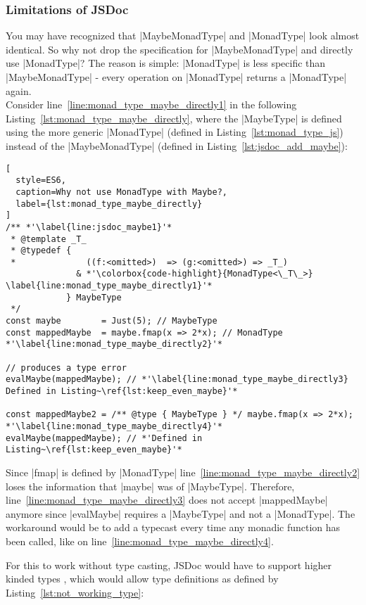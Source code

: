 \subsubsection{Limitations of JSDoc} %
\label{sec:Limitations of JSDoc}
You may have recognized that |MaybeMonadType| and |MonadType| look almost
identical. So why not drop the specification for |MaybeMonadType| and directly
use |MonadType|? The reason is simple: |MonadType| is less specific than
|MaybeMonadType| - every operation on |MonadType| returns a |MonadType|
again.\\
Consider line~\ref{line:monad_type_maybe_directly1} in the following
Listing~\ref{lst:monad_type_maybe_directly}, where the |MaybeType| is defined
using the more generic |MonadType| (defined in Listing~\ref{lst:monad_type_js})
instead of the |MaybeMonadType| (defined in Listing~\ref{lst:jsdoc_add_maybe}):

\begin{lstlisting}[
  style=ES6,
  caption=Why not use MonadType with Maybe?,
  label={lst:monad_type_maybe_directly}
]
/** *'\label{line:jsdoc_maybe1}'*
 * @template _T_
 * @typedef { 
 *              ((f:<omitted>)  => (g:<omitted>) => _T_)
              & *'\colorbox{code-highlight}{MonadType<\_T\_>}  \label{line:monad_type_maybe_directly1}'*
            } MaybeType
 */
const maybe        = Just(5); // MaybeType
const mappedMaybe  = maybe.fmap(x => 2*x); // MonadType *'\label{line:monad_type_maybe_directly2}'*

// produces a type error
evalMaybe(mappedMaybe); // *'\label{line:monad_type_maybe_directly3} Defined in Listing~\ref{lst:keep_even_maybe}'*

const mappedMaybe2 = /** @type { MaybeType } */ maybe.fmap(x => 2*x); *'\label{line:monad_type_maybe_directly4}'*
evalMaybe(mappedMaybe); // *'Defined in Listing~\ref{lst:keep_even_maybe}'*
\end{lstlisting}

Since |fmap| is defined by |MonadType|
line~\ref{line:monad_type_maybe_directly2} loses the information that |maybe|
was of |MaybeType|. Therefore, line~\ref{line:monad_type_maybe_directly3} does
not accept |mappedMaybe| anymore since |evalMaybe| requires a |MaybeType| and
not a |MonadType|. The workaround would be to add a typecast every time any
monadic function has been called, like on
line~\ref{line:monad_type_maybe_directly4}.

For this to work without type casting, JSDoc would have to support higher
kinded types \cite{baeldung_higher-kinded_2020}, which would allow type definitions as defined by
Listing~\ref{lst:not_working_type}:

